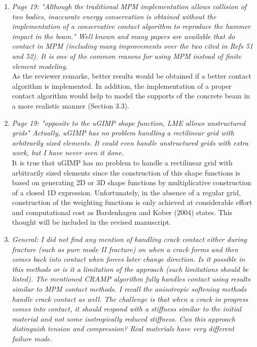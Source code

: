 \documentclass[12pt]{article}
\begin{document}
\begin{enumerate}
\item \textit{Page 19: "Although the traditional MPM implementation allows collision of two bodies, inaccurate energy conservation is obtained without the implementation of a conservative contact algorithm to reproduce the hammer impact in the beam." Well known and many papers are available that do contact in MPM (including many improvements over the two cited in Refs 51 and 52). It is one of the common reasons for using MPM instead of finite element modeling.}\\

As the reviewer remarks, better results would be obtained if a better contact algorithm is implemented. In addition, the implementation of a proper contact algorithm would help to model the supports of the concrete beam in a more realistic manner (Section 3.3). 

\item \textit{Page 19: "opposite to the uGIMP shape function, LME allows unstructured grids" Actually, uGIMP has no problem handling a rectilinear grid with arbitrarily sized elements. It could even handle unstructured grids with extra work, but I have never seen it done.}\\

It is true that uGIMP has no problem to handle a rectilinear grid with arbitrarily sized elements since the construction of this shape functions is based on generating 2D or 3D shape functions by multiplicative construction of a closed 1D expression. Unfortunately, in the absence of a regular grid, construction of the weighting functions is only achieved at considerable effort and computational cost as Bardenhagen and Kober \cite{Bardenhagen_2004} (2004) states. This thought will be included in the revised manuscript. 

\item \textit{General: I did not find any mention of handling crack contact either during fracture (such as pure mode II fracture) on when a crack forms and then comes back into contact when forces later change direction. Is it possible in this methods or is it a limitation of the approach (such limitations should be listed). The mentioned CRAMP algorithm fully handles contact using results similar to MPM contact methods. I recall the anisotropic softening methods handle crack contact as well. The challenge is that when a crack in progress comes into contact, it should respond with a stiffness similar to the initial material and not some isotropically reduced stiffness. Can this approach distinguish tension and compression? Real materials have very different failure mode.}\\


\end{enumerate}
\end{document}
